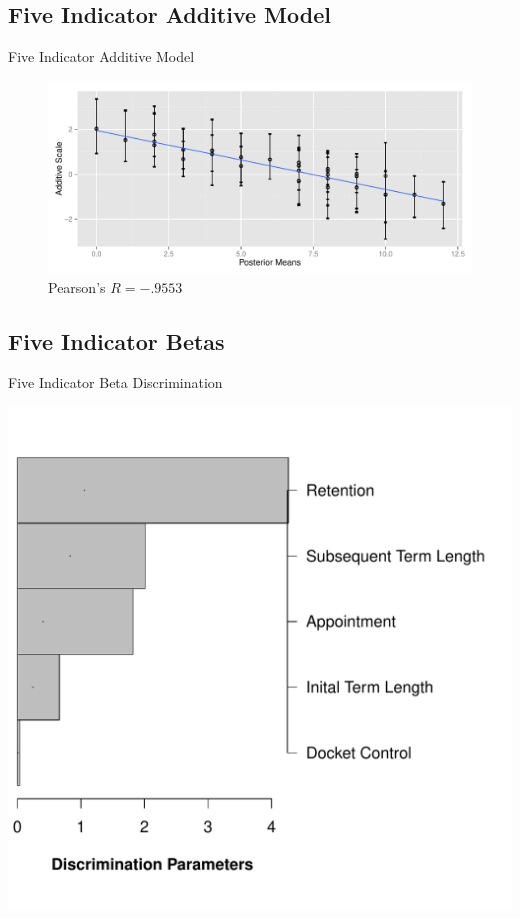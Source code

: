 \documentclass{beamer}              %
\begin{document}
\subsection{Five Indicator Additive Model}
\begin{frame}{Five Indicator Additive Model}	
\begin{figure}\centering
\includegraphics[scale=.5]{graphics/fiveind/fiveind_additive_ggplot}
\caption{Pearson's $R=-.9553$ }
\end{figure}
\end{frame}
\subsection{Five Indicator Betas}
\begin{frame}{Five Indicator Beta Discrimination}	
\begin{center}
\includegraphics[scale=.5]{graphics/fiveind/FiveBetaDiscrimination}
\end{center}
\end{frame}
\end{document}
